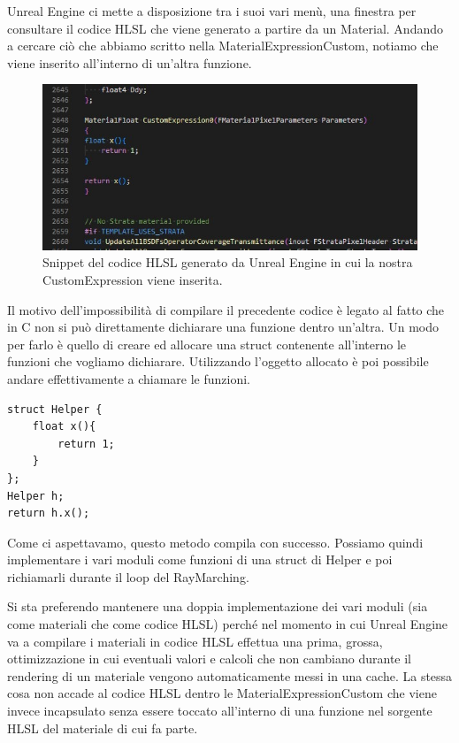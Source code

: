 \documentclass[main.tex]{subfiles}
\begin{document}
\noindent Unreal Engine ci mette a disposizione tra i suoi vari menù, una finestra per consultare il codice HLSL che viene generato a partire da un Material. Andando a cercare ciò che abbiamo scritto nella MaterialExpressionCustom, notiamo che viene inserito all'interno di un'altra funzione.
\begin{figure}[H] %
    \centering
    \includegraphics[width=0.8\linewidth]{img/renderingPipeline/hlslFunInUn.jpg}
    \caption{Snippet del codice HLSL generato da Unreal Engine in cui la nostra CustomExpression viene inserita.}
    \label{fig:2_funcInFunc}
\end{figure}

\noindent Il motivo dell'impossibilità di compilare il precedente codice è legato al fatto che in C non si può direttamente dichiarare una funzione dentro un'altra. Un modo per farlo è quello di creare ed allocare una struct contenente all'interno le funzioni che vogliamo dichiarare. Utilizzando l'oggetto allocato è poi possibile andare effettivamente a chiamare le funzioni.
\begin{lstlisting}
struct Helper {
    float x(){
        return 1;
    }
};
Helper h;
return h.x();
\end{lstlisting}
Come ci aspettavamo, questo metodo compila con successo. Possiamo quindi implementare i vari moduli come funzioni di una struct di Helper e poi richiamarli durante il loop del RayMarching. \newline

Si sta preferendo mantenere una doppia implementazione dei vari moduli (sia come materiali che come codice HLSL) perché nel momento in cui Unreal Engine va a compilare i materiali in codice HLSL effettua una prima, grossa, ottimizzazione in cui eventuali valori e calcoli che non cambiano durante il rendering di un materiale vengono automaticamente messi in una cache. La stessa cosa non accade al codice HLSL dentro le MaterialExpressionCustom che viene invece incapsulato senza essere toccato all'interno di una funzione nel sorgente HLSL del materiale di cui fa parte. \cite{hlslNoOptimize}
\end{document}
